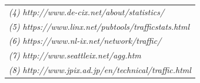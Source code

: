 \documentclass{sig-alternate}
\begin{document}
\begin{table}[t]
\begin{tabular}{l| l| r r| l}
\multicolumn{5}{l}{\textit{(4) http://www.de-cix.net/about/statistics/}}\\                           
\multicolumn{5}{l}{\textit{(5) https://www.linx.net/pubtools/trafficstats.html}}\\                           
\multicolumn{5}{l}{\textit{(6) https://www.nl-ix.net/network/traffic/}}\\                           
\multicolumn{5}{l}{\textit{(7) http://www.seattleix.net/agg.htm}}\\                  
\multicolumn{5}{l}{\textit{(8) http://www.jpix.ad.jp/en/technical/traffic.html}}                  
\end{tabular}
\label{tab:Traffic1}                               
\end{table}

\vspace{1,5cm}
\end{document}
